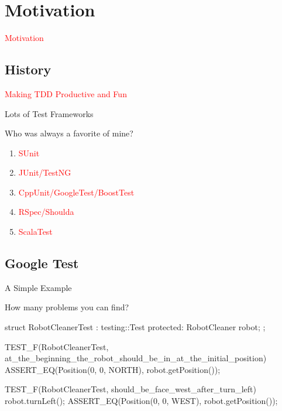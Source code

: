 \section{Motivation}
\label{sec:motivation}

\begin{frame}
  \begin{center}
    \Huge{\textcolor{red}{Motivation}}
  \end{center}
\end{frame}

\subsection{History}

\begin{frame}
  \begin{center}
    \huge{\textcolor{red}{Making TDD Productive and Fun}}
  \end{center}
\end{frame}

\begin{frame}{Lots of Test Frameworks} 
 \begin{block}{Who was always a favorite of mine?} 
  \begin{enumerate}
    \item \textcolor{red}{SUnit}
    \item \textcolor{red}{JUnit/TestNG}
    \item \textcolor{red}{CppUnit/GoogleTest/BoostTest}
    \item \textcolor{red}{RSpec/Shoulda}
    \item \textcolor{red}{ScalaTest}
  \end{enumerate}
 \end{block}
\end{frame}

\subsection{Google Test}

\begin{frame}[fragile]{A Simple Example}
\begin{block}{How many problems you can find?}
\begin{c++}
struct RobotCleanerTest : testing::Test
{
protected:
    RobotCleaner robot;
};

TEST_F(RobotCleanerTest, at_the_beginning_the_robot_should_be_in_at_the_initial_position)
{
    ASSERT_EQ(Position(0, 0, NORTH), robot.getPosition());
}

TEST_F(RobotCleanerTest, should_be_face_west_after_turn_left)
{
   robot.turnLeft();
   ASSERT_EQ(Position(0, 0, WEST), robot.getPosition());
}
\end{c++}
\end{block}
\end{frame}

